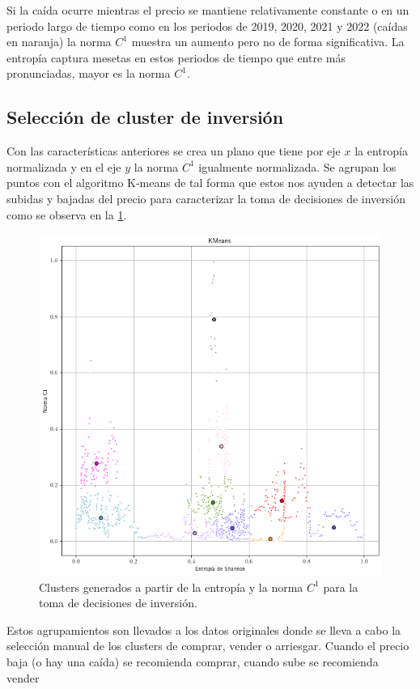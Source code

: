 Si la caída ocurre mientras el precio se mantiene relativamente constante o en un periodo largo de tiempo como en los periodos de 2019, 2020, 2021 y 2022 (caídas en naranja) la norma $C^1$ muestra un aumento pero no de forma significativa. La entropía captura mesetas en estos periodos de tiempo que entre más pronunciadas, mayor es la norma $C^1$.
\subsection{Selección de cluster de inversión}

Con las características anteriores se crea un plano que tiene por eje $x$ la entropía normalizada y en el eje $y$ la norma $C^1$ igualmente normalizada. Se agrupan los puntos con el algoritmo K-means de tal forma que estos nos ayuden a detectar las subidas y bajadas del precio para caracterizar la toma de decisiones de inversión como se observa en la \cref{fig28}.

\begin{figure}[h!]
	\centering
	\includegraphics[scale=0.5]{Chapter5/calsifica_kmeans.png}
	\caption{Clusters generados a partir de la entropía y la norma $C^1$ para la toma de decisiones de inversión.}
	\label{fig28}
\end{figure}

Estos agrupamientos son llevados a los datos originales donde se lleva a cabo la selección manual de los clusters de comprar, vender o arriesgar. Cuando el precio baja (o hay una caída) se recomienda comprar, cuando sube se recomienda vender

